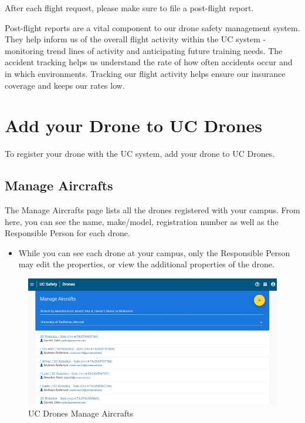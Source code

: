 \documentclass[
  12pt,
]{book}
\providecommand{\tightlist}{%
  \setlength{\itemsep}{0pt}\setlength{\parskip}{0pt}}
\begin{document}
After each flight request, please make sure to file a post-flight report.

Post-flight reports are a vital component to our drone safety management system. They help inform us of the overall flight activity within the UC system - monitoring trend lines of activity and anticipating future training needs. The accident tracking helps us understand the rate of how often accidents occur and in which environments. Tracking our flight activity helps ensure our insurance coverage and keeps our rates low.

\section{Add your Drone to UC Drones}\label{UCDrones-drone}

To register your drone with the UC system, add your drone to UC Drones.

\subsection{Manage Aircrafts}\label{manag-aircraft}

The Manage Aircrafts page lists all the drones registered with your campus. From here, you can see the name, make/model, registration number as well as the Responsible Person for each drone.

\begin{itemize}
\tightlist
\item
  While you can see each drone at your campus, only the Responsible Person may edit the properties, or view the additional properties of the drone.
\end{itemize}

\begin{figure}

{\centering \includegraphics[width=0.95\linewidth]{images/UCDrones_manage_drones} 

}

\caption{UC Drones Manage Aircrafts}\label{fig:UCDrones-manage-aircrafts}
\end{figure}
\end{document}
